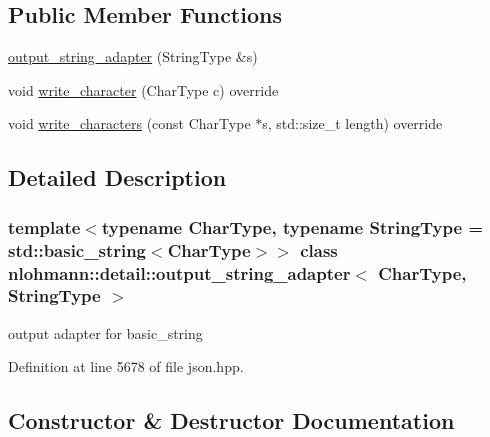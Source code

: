 \subsection*{Public Member Functions}
\begin{DoxyCompactItemize}
\item 
\hyperlink{classnlohmann_1_1detail_1_1output__string__adapter_a1e21ccc96316cb7fc1adcc58f509d581}{output\+\_\+string\+\_\+adapter} (String\+Type \&s)
\item 
void \hyperlink{classnlohmann_1_1detail_1_1output__string__adapter_a2d76cc6c88ddbc196a63fcfcac9ee7d1}{write\+\_\+character} (Char\+Type c) override
\item 
void \hyperlink{classnlohmann_1_1detail_1_1output__string__adapter_ab5ea4da075305d225dfd84ad997e8747}{write\+\_\+characters} (const Char\+Type $\ast$s, std\+::size\+\_\+t length) override
\end{DoxyCompactItemize}


\subsection{Detailed Description}
\subsubsection*{template$<$typename Char\+Type, typename String\+Type = std\+::basic\+\_\+string$<$\+Char\+Type$>$$>$\newline
class nlohmann\+::detail\+::output\+\_\+string\+\_\+adapter$<$ Char\+Type, String\+Type $>$}

output adapter for basic\+\_\+string 

Definition at line 5678 of file json.\+hpp.



\subsection{Constructor \& Destructor Documentation}
\mbox{\label{classnlohmann_1_1detail_1_1output__string__adapter_a1e21ccc96316cb7fc1adcc58f509d581}} 
